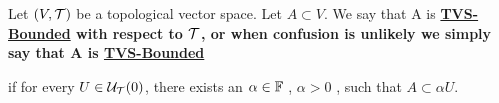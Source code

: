 \label{def:topologicalvectorspaceboundedset}
\newcommand{\TVSBounded}[0]{
    \bf \hyperref[def:topologicalvectorspaceboundedset]{TVS-Bounded} \rm
}

\begin{df}
Let $(V,\mathcal{T})$ be a topological vector space.
Let $A \subset V$. 
We say that A is \TVSBounded with respect to $\mathcal{T}$,
or when confusion is unlikely we simply say that A is \TVSBounded
if for every $U \in \mathcal{U}_{\mathcal{T}}(0)$, there exists an $\alpha \in \mathbb{F}$
, $\alpha > 0$
, such that $A \subset \alpha U$. 
\end{df}
